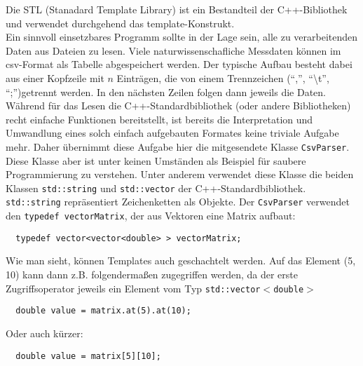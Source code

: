 \documentclass[paper=A4, pagesize, DIV=calc, smallheadings,
fontsize=11pt, expansion=false]{scrreprt}
\begin{document}
  Die STL (Stanadard Template Library) ist ein Bestandteil der C++-Bibliothek und verwendet durchgehend das template-Konstrukt.\\
  Ein sinnvoll einsetzbares Programm sollte in der Lage sein, alle zu verarbeitenden Daten aus Dateien zu lesen. 
  Viele naturwissenschafliche Messdaten können im csv-Format als Tabelle abgespeichert werden. 
  Der typische Aufbau besteht dabei aus einer Kopfzeile mit $n$ Einträgen, die von einem Trennzeichen (``,'', ``\textbackslash t'', ``;'')getrennt werden. In den nächsten Zeilen folgen dann jeweils die Daten.
  Während für das Lesen die C++-Standardbibliothek (oder andere Bibliotheken) recht einfache Funktionen bereitstellt, 
  ist bereits die Interpretation und Umwandlung eines solch einfach aufgebauten Formates keine triviale Aufgabe mehr.  
  Daher übernimmt diese Aufgabe hier die mitgesendete Klasse \texttt{CsvParser}. 
  Diese Klasse aber ist unter keinen Umständen als Beispiel für saubere Programmierung zu verstehen.
  Unter anderem verwendet diese Klasse die beiden Klassen \texttt{std::string} und \texttt{std::vector} der C++-Standardbibliothek. 
  \texttt{std::string} repräsentiert Zeichenketten als Objekte.
  Der \texttt{CsvParser} verwendet den \texttt{typedef vectorMatrix}, der aus Vektoren eine Matrix aufbaut:
\begin{verbatim}
  typedef vector<vector<double> > vectorMatrix;
\end{verbatim}
Wie man sieht, können Templates auch geschachtelt werden.
Auf das Element (5, 10) kann dann z.B. folgendermaßen zugegriffen werden, da der erste Zugriffsoperator jeweils ein Element vom Typ  \texttt{std::vector$<$double$>$}
\begin{verbatim}
  double value = matrix.at(5).at(10);
\end{verbatim}
Oder auch kürzer:
\begin{verbatim}
  double value = matrix[5][10];
\end{verbatim}
\end{document}

